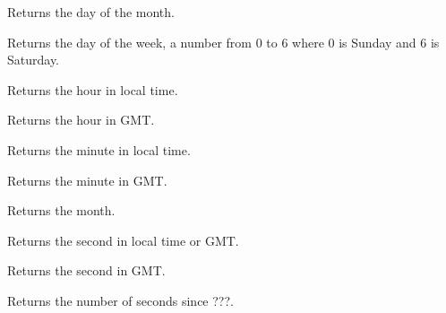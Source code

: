
Returns the day of the month.

\label{wxtimegetdatofweek}


Returns the day of the week, a number from 0 to 6 where 0 is Sunday and 6 is Saturday.

\label{wxtimegethour}


Returns the hour in local time.

\label{wxtimegethourgmt}


Returns the hour in GMT.

\label{wxtimegetminute}


Returns the minute in local time.

\label{wxtimegetminutegmt}


Returns the minute in GMT.

\label{wxtimegetmonth}


Returns the month.

\label{wxtimegetsecond}


Returns the second in local time or GMT.

\label{wxtimegetsecondgmt}


Returns the second in GMT.

\label{wxtimegetseconds}


Returns the number of seconds since ???.

\label{wxtimegetyear}


